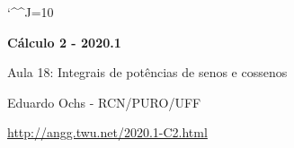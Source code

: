 \documentclass[oneside,12pt]{article}
\begin{document}
\catcode`\^^J=10


\long{}
\long{}
\long{}
\long{}
\long{}
\long{}
\long{}
\long{}
\long{}
\long{}

\long{}
\long{}

\def\frown{\ensuremath{{=}{(}}}
\def\True {\mathbf{V}}
\def\False{\mathbf{F}}

\def\drafturl{http://angg.twu.net/LATEX/2020-1-C2.pdf}
\def\drafturl{http://angg.twu.net/2020.1-C2.html}
\def\draftfooter{\tiny \href{\drafturl}{\jobname{}} \ColorBrown{\shorttoday{} \hours}}



%

\thispagestyle{empty}

\begin{center}

\vspace*{1.2cm}

{\bf \Large Cálculo 2 - 2020.1}

\bsk

Aula 18: Integrais de potências de senos e cossenos

\bsk

Eduardo Ochs - RCN/PURO/UFF

\url{http://angg.twu.net/2020.1-C2.html}

\end{center}

\newpage
\end{document}

